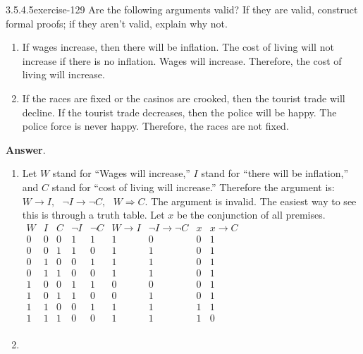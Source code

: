 \documentclass[twoside,10pt,]{book}
\numberwithin{equation}{section}
\begin{document}
\begin{divisionsolution}{3.5.4.5}{}{exercise-129}%
\hypertarget{p-1223}{}%
Are the following arguments valid? If they are valid, construct formal proofs; if they aren't valid, explain why not.%
\par
\hypertarget{p-1224}{}%
\leavevmode%
\begin{enumerate}[label=(\alph*)]
\item\hypertarget{li-697}{}\hypertarget{p-1225}{}%
If wages increase, then there will be inflation. The cost of living will not increase if there is no inflation. Wages will increase. Therefore, the cost of living will increase.%
\item\hypertarget{li-698}{}\hypertarget{p-1226}{}%
If the races are fixed or the casinos are crooked, then the tourist trade will decline. If the tourist trade decreases, then the police will be happy. The police force is never happy. Therefore, the races are not fixed.%
\end{enumerate}
%
\par\smallskip%
\noindent\textbf{Answer}.\quad%
\hypertarget{p-1227}{}%
\leavevmode%
\begin{enumerate}[label=(\alph*)]
\item\hypertarget{li-699}{}Let \(W\) stand for ``Wages will increase,'' \(I\) stand for ``there will be inflation,'' and \(C\) stand for ``cost of living will increase.'' Therefore the argument is: \(W\to I,\text{   }\neg I\to \neg C,\text{   }W\Rightarrow C\). The argument is invalid. The easiest way to see this is through a truth table. Let \(x\) be the conjunction of all premises. \(\begin{array}{ccccccccc}
W  & I  & C  & \neg I  & \neg C  & W\to I  & \neg I\to \neg C  & x  & x\to C \\
\hline
0  & 0  & 0  & 1  & 1 & 1  & 0  & 0  & 1 \\
0  & 0  & 1  & 1  & 0 & 1  & 1  & 0  & 1 \\
0  & 1  & 0  & 0  & 1 & 1  & 1  & 0  & 1 \\
0  & 1  & 1  & 0  & 0 & 1  & 1  & 0  & 1 \\
1  & 0  & 0  & 1  & 1 & 0  & 0  & 0  & 1 \\
1  & 0  & 1  & 1  & 0 & 0  & 1  & 0  & 1 \\
1  & 1  & 0  & 0  & 1 & 1  & 1  & 1  & 1 \\
1  & 1  & 1  & 0  & 0 & 1  & 1  & 1  & 0 \\
\end{array}\)%
\item\hypertarget{li-700}{}\hypertarget{p-1228}{}%

\end{enumerate}
\end{divisionsolution}
\end{document}
